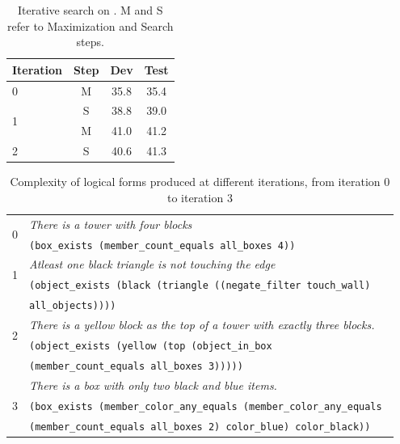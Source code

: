 \begin{table}
	\centering
	\begin{tabular}{lccc}
	\toprule
	Iteration & Step & Dev & Test \\
	\midrule
	0 & M & 35.8 & 35.4 \\
	\hline
	\multirow{2}{*}{1} & S & 38.8 & 39.0  \\
	& M & 41.0 & 41.2  \\
	\hline
	2 & S & 40.6 & 41.3 \\
	\bottomrule
	\end{tabular}
	\caption{Iterative search on \WTQ{}.  M and S refer to Maximization and Search steps.}\label{tab:iterative_search_wtq}
\end{table}

\begin{table}
	\centering
	\begin{tabular}{cl}
	\multirow{2}{*}{0} & \textit{There is a tower with four blocks}\\
	& \texttt{(box\_exists (member\_count\_equals all\_boxes 4))}\\
	\multirow{2}{*}{1} & \textit{Atleast one black triangle is not touching the edge}\\
	& \texttt{(object\_exists (black (triangle ((negate\_filter touch\_wall)} \\
	& \texttt{all\_objects))))}\\
	\multirow{2}{*}{2} & \textit{There is a yellow block as the top of a tower with exactly three blocks.} \\
	& \texttt{(object\_exists (yellow (top (object\_in\_box} \\
	& \texttt{(member\_count\_equals all\_boxes 3)))))}\\
	\multirow{3}{*}{3} & \textit{There is a box with only two black and blue items.} \\
	& \texttt{(box\_exists (member\_color\_any\_equals (member\_color\_any\_equals }\\
	& \texttt{(member\_count\_equals all\_boxes 2) color\_blue) color\_black))}\\ 
	\end{tabular}
	\caption{Complexity of logical forms produced at different iterations, from iteration 0 to iteration 3}\label{tab:logical_form_complexity}
\end{table}
